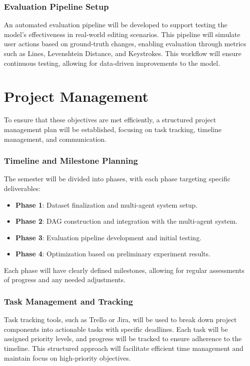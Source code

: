 \subsubsection{Evaluation Pipeline Setup}

An automated evaluation pipeline will be developed to support testing the model’s effectiveness in real-world editing scenarios. This pipeline will simulate user actions based on ground-truth changes, enabling evaluation through metrics such as Lines, Levenshtein Distance, and Keystrokes. This workflow will ensure continuous testing, allowing for data-driven improvements to the model.

\section{Project Management}

To ensure that these objectives are met efficiently, a structured project management plan will be established, focusing on task tracking, timeline management, and communication.

\subsubsection{Timeline and Milestone Planning}

The semester will be divided into phases, with each phase targeting specific deliverables:
\begin{itemize}
    \item \textbf{Phase 1}: Dataset finalization and multi-agent system setup.
    \item \textbf{Phase 2}: DAG construction and integration with the multi-agent system.
    \item \textbf{Phase 3}: Evaluation pipeline development and initial testing.
    \item \textbf{Phase 4}: Optimization based on preliminary experiment results.
\end{itemize}

Each phase will have clearly defined milestones, allowing for regular assessments of progress and any needed adjustments.

\subsubsection{Task Management and Tracking}

Task tracking tools, such as Trello or Jira, will be used to break down project components into actionable tasks with specific deadlines. Each task will be assigned priority levels, and progress will be tracked to ensure adherence to the timeline. This structured approach will facilitate efficient time management and maintain focus on high-priority objectives.


